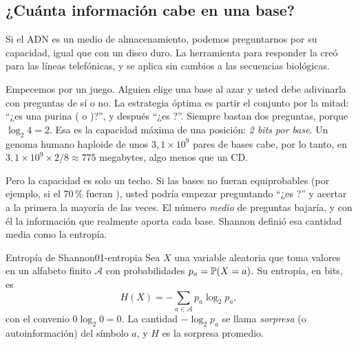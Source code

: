 \subsection{¿Cuánta información cabe en una base?}

Si el ADN es un medio de almacenamiento, podemos preguntarnos por su capacidad, igual que con un disco duro. La herramienta para responder la creó \textcite{c01-shannon1948} para las líneas telefónicas, y se aplica sin cambios a las secuencias biológicas.

Empecemos por un juego. Alguien elige una base al azar y usted debe adivinarla con preguntas de sí o no. La estrategia óptima es partir el conjunto por la mitad: ``¿es una purina ( o )?'', y después ``¿es ?''. Siempre bastan dos preguntas, porque $\log_2 4 = 2$. Esa es la capacidad máxima de una posición: \emph{2 bits por base}. Un genoma humano haploide de unos $3{,}1\times10^9$ pares de bases cabe, por lo tanto, en $3{,}1\times10^9\times 2/8 \approx 775$ megabytes, algo menos que un CD.

Pero la capacidad es solo un techo. Si las bases no fueran equiprobables (por ejemplo, si el 70\,\% fueran ), usted podría empezar preguntando ``¿es ?'' y acertar a la primera la mayoría de las veces. El número \emph{medio} de preguntas bajaría, y con él la información que realmente aporta cada base. Shannon definió esa cantidad media como la entropía.

\begin{definicion}{Entropía de Shannon}{01-entropia}
Sea $X$ una variable aleatoria que toma valores en un alfabeto finito $\mathcal{A}$ con probabilidades $p_a=\mathbb{P}(X=a)$. Su entropía, en bits, es
\begin{equation}\label{eq:01-entropia}
H(X) = -\sum_{a\in\mathcal{A}} p_a \log_2 p_a,
\end{equation}
con el convenio $0\log_2 0 = 0$. La cantidad $-\log_2 p_a$ se llama \emph{sorpresa} (o autoinformación) del símbolo $a$, y $H$ es la sorpresa promedio.
\end{definicion}

\begin{simbolos}
\end{simbolos}

